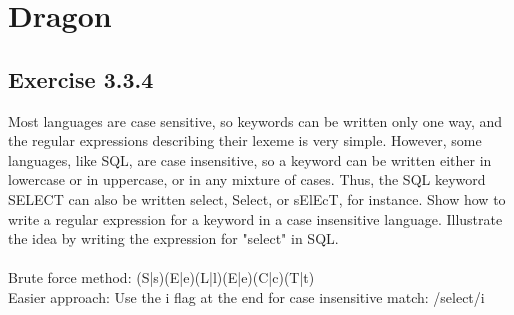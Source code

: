 \documentclass[letterpaper, 10pt, DIV=13]{scrartcl}
\numberwithin{equation}{section}
\numberwithin{figure}{section}
\numberwithin{table}{section}
\begin{document}
\section{Dragon}
\subsection{Exercise 3.3.4}
Most languages are case sensitive, so keywords can be written only one way, and the regular expressions describing their lexeme is very simple. However, some languages, like SQL, are case insensitive, so a keyword can be written either in lowercase or in uppercase, or in any mixture of cases. Thus, the SQL keyword SELECT can also be written select, Select, or sElEcT, for instance. Show how to write a regular expression for a keyword in a case insensitive language. Illustrate the idea by writing the expression for "select" in SQL. \\\\

Brute force method: (S|s)(E|e)(L|l)(E|e)(C|c)(T|t) \\
Easier approach: Use the i flag at the end for case insensitive match: /select/i
\end{document}
